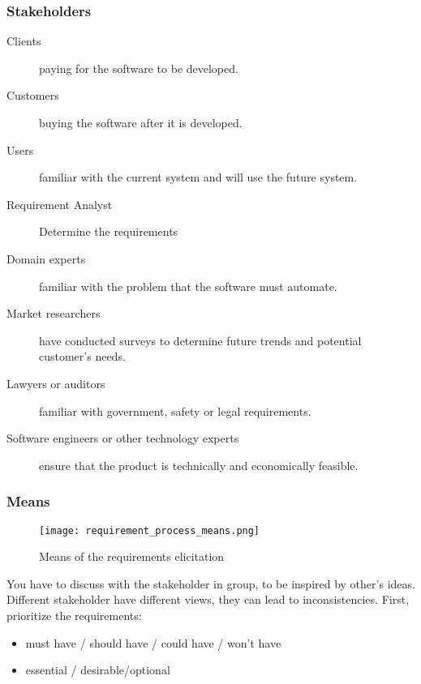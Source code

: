 \subsubsection{Stakeholders}

\begin{description}
    \item[Clients] paying for the software to be developed.
    \item[Customers] buying the software after it is developed.
    \item[Users] familiar with the current system and will use the future system.
    \item[Requirement Analyst] Determine the requirements 
    \item[Domain experts] familiar with the problem that the software must automate.
    \item[Market researchers] have conducted surveys to determine future trends and potential customer’s needs.
    \item[Lawyers or auditors] familiar with government, safety or legal requirements.
    \item[Software engineers or other technology experts] ensure that the product is technically and economically feasible.
\end{description}

\subsubsection{Means}

\begin{figure}[!ht]
    \centering
    \texttt{[image: requirement\_process\_means.png]}
    \caption{Means of the requirements elicitation}
\end{figure}


You have to discuss with the stakeholder in group, to be inspired by other’s ideas. Different
stakeholder have different views, they can lead to inconsistencies. First, prioritize the
requirements:
\begin{itemize}
	\item must have / should have / could have / won't have
	\item essential / desirable/optional
\end{itemize}

